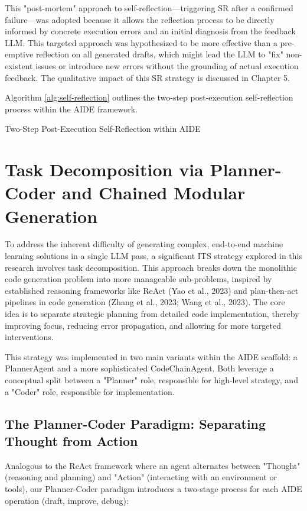 This "post-mortem" approach to self-reflection—triggering SR after a confirmed failure—was adopted because it allows the reflection process to be directly informed by concrete execution errors and an initial diagnosis from the feedback LLM. This targeted approach was hypothesized to be more effective than a pre-emptive reflection on all generated drafts, which might lead the LLM to "fix" non-existent issues or introduce new errors without the grounding of actual execution feedback. The qualitative impact of this SR strategy is discussed in Chapter 5.

Algorithm \ref{alg:self-reflection} outlines the two-step post-execution self-reflection process within the AIDE framework.

\begin{algorithm}
\caption{Two-Step Post-Execution Self-Reflection within AIDE}
\label{alg:self-reflection}
\end{algorithm}

\section{Task Decomposition via Planner-Coder and Chained Modular Generation}

To address the inherent difficulty of generating complex, end-to-end machine learning solutions in a single LLM pass, a significant ITS strategy explored in this research involves task decomposition. This approach breaks down the monolithic code generation problem into more manageable sub-problems, inspired by established reasoning frameworks like ReAct (Yao et al., 2023) and plan-then-act pipelines in code generation (Zhang et al., 2023; Wang et al., 2023). The core idea is to separate strategic planning from detailed code implementation, thereby improving focus, reducing error propagation, and allowing for more targeted interventions.

This strategy was implemented in two main variants within the AIDE scaffold: a PlannerAgent and a more sophisticated CodeChainAgent. Both leverage a conceptual split between a "Planner" role, responsible for high-level strategy, and a "Coder" role, responsible for implementation.

\subsection{The Planner-Coder Paradigm: Separating Thought from Action}
Analogous to the ReAct framework where an agent alternates between "Thought" (reasoning and planning) and "Action" (interacting with an environment or tools), our Planner-Coder paradigm introduces a two-stage process for each AIDE operation (draft, improve, debug):

